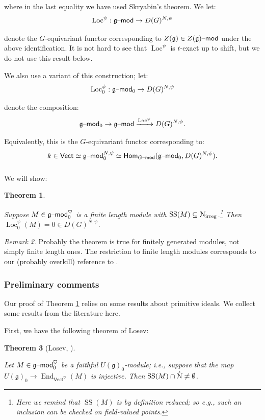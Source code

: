 \documentclass[reqno,11pt]{amsart}
\numberwithin{equation}{subsection}
\newtheorem{thm}{Theorem}[subsubsection]
\theoremstyle{remark}
\newtheorem{rem}[thm]{Remark}
\newcommand{\xar}[1]{\xrightarrow{#1}}
\newcommand{\Loc}{\on{Loc}}
\newcommand{\sN}{{\EuScript N}}
\newcommand{\fg}{{\mathfrak g}}
\newcommand{\on}{\operatorname}
\newcommand{\mathendash}{\text{\textendash}}
\newcommand{\End}{\on{End}}
\newcommand{\Vect}{\mathsf{Vect}}
\renewcommand{\mod}{\mathendash\mathsf{mod}}
\newcommand{\TwoHom}{\mathsf{Hom}}
\newcommand{\heart}{\heartsuit}
\renewcommand{\o}[1]{\mathring{#1}}
\renewcommand{\subset}{\subseteq}
\newcommand{\irreg}{\on{irreg}}
\renewcommand{\SS}{\on{SS}}
\begin{document}
\noindent where in the last equality we have used
Skryabin's theorem. We let:
%
\[
\Loc^{\psi}:\fg\mod \to D(G)^{N,\psi}
\]

\noindent denote the $G$-equivariant functor corresponding to 
$Z(\fg) \in Z(\fg)\mod$ under the above identification.
It is not hard to see that $\Loc^{\psi}$ is $t$-exact up to 
shift, but we do not use this result below.

We also use a variant of this construction; 
let:
%
\[
\Loc_0^{\psi}:\fg\mod_0\to D(G)^{N,\psi}
\]

\noindent denote the composition:
%
\[
\fg\mod_0 \to \fg\mod \xar{\Loc^{\psi}} D(G)^{N,\psi}.
\]

\noindent Equivalently, this is the $G$-equivariant functor
corresponding to:
%
\[
k \in \Vect \simeq \fg\mod_0^{N,\psi} \simeq 
\TwoHom_{G\mod}(\fg\mod_0,D(G)^{N,\psi}).
\]

\subsubsection{}

We will show:

\begin{thm}\label{t:lie-g-irreg}

Suppose $M \in \fg\mod_0^{\heart}$ is a finite length
module with $\SS(M) \subset \sN_{\irreg}$.\footnote{Here we
remind that $\SS(M)$ is by definition reduced; so e.g.,
such an inclusion can be checked on field-valued points.}
Then $\Loc_0^{\psi}(M) = 0 \in D(G)^{N,\psi}$.

\end{thm}

\begin{rem}

Probably the theorem is true for finitely generated modules,
not simply finite length ones. The restriction to 
finite length modules corresponds to our (probably overkill)
reference to \cite{losev-holonomic}.  

\end{rem}

\subsubsection{Preliminary comments}

Our proof of Theorem \ref{t:lie-g-irreg} relies on some results
about primitive ideals. We collect some results from the literature
here.

First, we have the following theorem of Losev:
%
\begin{thm}[Losev, \cite{losev-holonomic}]\label{t:losev}

Let $M \in \fg\mod_0^{\heart}$ be a faithful $U(\fg)_0$-module;
i.e., suppose that the map $U(\fg)_0 \to \End_{\Vect^{\heart}}(M)$
is injective. Then $\SS(M) \cap \o{\sN} \neq \emptyset$. 

\end{thm}
\end{document}
